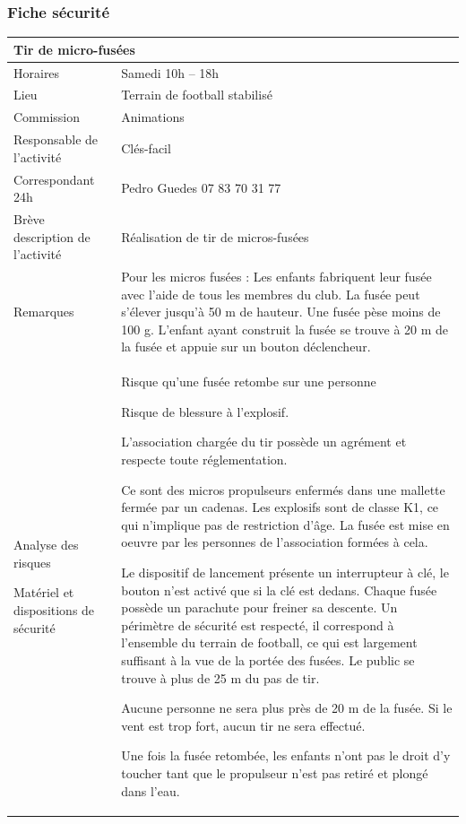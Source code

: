\documentclass[hidelinks, paper=a4, fontsize=13pt]{report}
\begin{document}
\subsubsection{Fiche sécurité}
\begin{center}
\begin{tabular}{ | p{6cm} | p{10cm} | }
\hline
	\multicolumn{2}{|l|}{Tir de micro-fusées}  \\ \hline
	Horaires & Samedi 10h – 18h \\ \hline
	Lieu & Terrain de football stabilisé \\ \hline
	Commission & Animations \\ \hline
	Responsable de l'activité & Clés-facil \\ \hline
	Correspondant 24h & Pedro Guedes 07 83 70 31 77 \\ \hline
	Brève description de l'activité & Réalisation de tir de micros-fusées \\ \hline
	Remarques & Pour les micros fusées :
Les enfants fabriquent leur fusée avec l’aide de tous les membres du club. La fusée peut s’élever jusqu’à 50 m de hauteur. Une fusée pèse moins de 100 g. L’enfant ayant construit la fusée se trouve à 20 m de la fusée et appuie sur un bouton déclencheur. \\ \hline
Analyse des risques
	
Matériel et dispositions de sécurité & Risque qu’une fusée retombe sur une personne

Risque de blessure à l’explosif.

L’association chargée du tir possède un agrément et respecte toute réglementation.

Ce sont des micros propulseurs enfermés dans une mallette fermée par un cadenas. Les explosifs sont de classe K1, ce qui n’implique pas de restriction d’âge. La fusée est mise en oeuvre par les personnes de l’association formées à cela.

Le dispositif de lancement présente un interrupteur à clé, le bouton n’est activé que si la clé est dedans.
Chaque fusée possède un parachute pour freiner sa descente. Un périmètre de sécurité est respecté, il correspond à l’ensemble du terrain de football, ce qui est largement suffisant à la vue de la portée des fusées. Le public se trouve à plus de 25 m du pas de tir.

Aucune personne ne sera plus près de 20 m de la fusée. Si le vent est trop fort, aucun tir ne sera effectué.

Une fois la fusée retombée, les enfants n’ont pas le droit d’y toucher tant que le propulseur n’est pas retiré et plongé dans l’eau.  \\ \hline
\end{tabular}

\end{center}
\newpage
\end{document}
